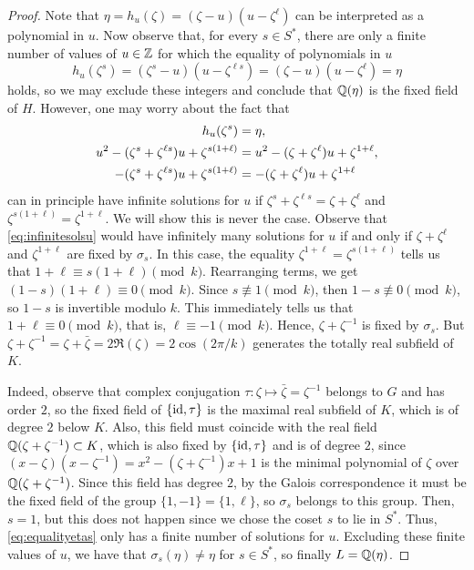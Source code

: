 \documentclass[../main.tex]{subfiles}
\begin{document}
\begin{proof}
	Note that $\eta=h_u(\zeta)=(\zeta-u)(u-\zeta^\ell)$ can be interpreted as a polynomial in $u$. Now observe that, for every $s\in S^*$, there are only a finite number of values of $u\in\mathbb{Z}$ for which the equality of polynomials in $u$
	\begin{equation}\label{eq:equalityetas}
		h_u(\zeta^s)=(\zeta^s-u)(u-\zeta^{\ell s})=(\zeta-u)(u-\zeta^\ell)=\eta
	\end{equation}
	holds, so we may exclude these integers and conclude that $\mathbb{Q}(\eta)$ is the fixed field of $H$. However, one may worry about the fact that 
	\begin{align}
		h_u(\zeta^s)&=\eta \notag,\\
		u^2-(\zeta^s+\zeta^{\ell s})u+\zeta^{s(1+\ell)}&=u^2-(\zeta+\zeta^\ell)u+\zeta^{1+\ell} \notag,\\
		-(\zeta^s+\zeta^{\ell s})u+\zeta^{s(1+\ell)}&=-(\zeta+\zeta^\ell)u+\zeta^{1+\ell}\label{eq:infinitesolsu}
	\end{align}
	can in principle have infinite solutions for $u$ if $\zeta^s+\zeta^{\ell s}=\zeta+\zeta^\ell$ and $\zeta^{s(1+\ell)}=\zeta^{1+\ell}$. We will show this is never the case. Observe that \cref{eq:infinitesolsu} would have infinitely many solutions for $u$ if and only if $\zeta+\zeta^\ell$ and $\zeta^{1+\ell}$ are fixed by $\sigma_s$. In this case, the equality $\zeta^{1+\ell}=\zeta^{s(1+\ell)}$ tells us that $1+\ell\equiv s(1+\ell)\pmod{k}$. Rearranging terms, we get $(1-s)(1+\ell)\equiv 0\pmod{k}$. Since $s\not\equiv 1\pmod{k}$, then $1-s\not\equiv 0\pmod{k}$, so $1-s$ is invertible modulo $k$. This immediately tells us that $1+\ell\equiv 0\pmod{k}$, that is, $\ell\equiv -1\pmod{k}$. Hence, $\zeta+\zeta^{-1}$ is fixed by $\sigma_s$. But $\zeta+\zeta^{-1}=\zeta+\bar{\zeta}=2\Re(\zeta)=2\cos(2\pi/k)$ generates the totally real subfield of $K$. 
	
	Indeed, observe that complex conjugation $\tau:\zeta\mapsto\bar{\zeta}=\zeta^{-1}$ belongs to $G$ and has order $2$, so the fixed field of $\{\mathrm{id},\tau\}$ is the maximal real subfield of $K$, which is of degree $2$ below $K$. Also, this field must coincide with the real field $\mathbb{Q}(\zeta+\zeta^{-1})\subset K$, which is also fixed by $\{\mathrm{id},\tau\}$ and is of degree $2$, since $(x-\zeta)(x-\zeta^{-1})=x^2-(\zeta+\zeta^{-1})x+1$ is the minimal polynomial of $\zeta$ over $\mathbb{Q}(\zeta+\zeta^{-1})$. Since this field has degree $2$, by the Galois correspondence it must be the fixed field of the group $\{1,-1\}=\{1,\ell\}$, so $\sigma_s$ belongs to this group. Then, $s=1$, but this does not happen since we chose the coset $s$ to lie in $S^*$. Thus, \cref{eq:equalityetas} only has a finite number of solutions for $u$. Excluding these finite values of $u$, we have that $\sigma_s(\eta)\neq \eta$ for $s\in S^*$, so finally $L=\mathbb{Q}(\eta)$.
	

\end{proof}
\end{document}
